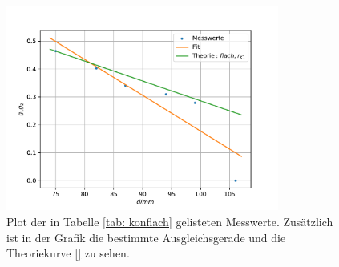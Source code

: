 \begin{figure}[h!]
  \centering
  \includegraphics[width=0.8\textwidth]{../Messdaten/plots/konflach.pdf}
  \caption{Plot der in Tabelle \ref{tab: konflach} gelisteten Messwerte. Zusätzlich ist in der Grafik die bestimmte Ausgleichsgerade und die Theoriekurve \eqref{} zu sehen.}
  \label{fig: konflach}
\end{figure}
\FloatBarrier
